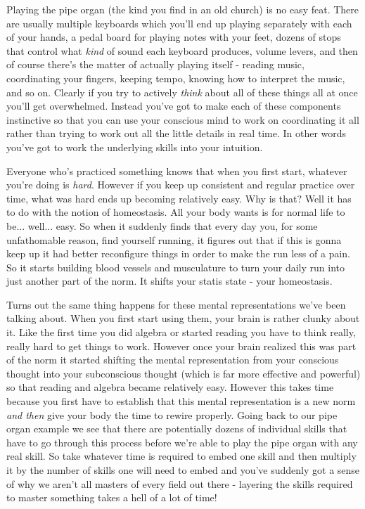 \documentclass[11pt,a5paper]{book}
\begin{document}
Playing the pipe organ (the kind you find in an old church) is no easy feat. There are usually multiple keyboards which you'll end up playing separately with each of your hands, a pedal board for playing notes with your feet, dozens of stops that control what \textit{kind} of sound each keyboard produces, volume levers, and then of course there's the matter of actually playing itself - reading music, coordinating your fingers, keeping tempo, knowing how to interpret the music, and so on. Clearly if you try to actively \textit{think} about all of these things all at once you'll get overwhelmed. Instead you've got to make each of these components instinctive so that you can use your conscious mind to work on coordinating it all rather than trying to work out all the little details in real time. In other words you've got to work the underlying skills into your intuition.
\newline 

Everyone who's practiced something knows that when you first start, whatever you're doing is \textit{hard}. However if you keep up consistent and regular practice over time, what was hard ends up becoming relatively easy. Why is that? Well it has to do with the notion of homeostasis. All your body wants is for normal life to be... well... easy. So when it suddenly finds that every day you, for some unfathomable reason, find yourself running, it figures out that if this is gonna keep up it had better reconfigure things in order to make the run less of a pain. So it starts building blood vessels and musculature to turn your daily run into just another part of the norm. It shifts your statis state - your homeostasis. 
\newline

Turns out the same thing happens for these mental representations we've been talking about. When you first start using them, your brain is rather clunky about it. Like the first time you did algebra or started reading you have to think really, really hard to get things to work. However once your brain realized this was part of the norm it started shifting the mental representation from your conscious thought into your subconscious thought (which is far more effective and powerful) so that reading and algebra became relatively easy. However this takes time because you first have to establish that this mental representation is a new norm \textit{and then} give your body the time to rewire properly. Going back to our pipe organ example we see that there are potentially dozens of individual skills that have to go through this process before we're able to play the pipe organ with any real skill. So take whatever time is required to embed one skill and then multiply it by the number of skills one will need to embed and you've suddenly got a sense of why we aren't all masters of every field out there - layering the skills required to master something takes a hell of a lot of time!
\newline
\end{document}
